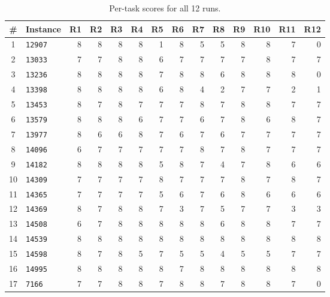\begin{table}[h]
\centering
\small
\caption{Per-task scores for all 12 runs.}\label{tab:scorecard}
\setlength{\tabcolsep}{3pt}
\begin{tabular}{clrrrrrrrrrrrr}
\toprule
\textbf{\#} & \textbf{Instance}
  & \textbf{R1} & \textbf{R2} & \textbf{R3} & \textbf{R4}
  & \textbf{R5} & \textbf{R6} & \textbf{R7} & \textbf{R8}
  & \textbf{R9} & \textbf{R10} & \textbf{R11} & \textbf{R12} \\
\midrule
 1 & \texttt{12907}  &  8 &  8 &  8 &  8 &  1 &  8 &  5 &  5 &  8 &  8 &  7 &  0 \\
 2 & \texttt{13033}  &  7 &  7 &  8 &  8 &  6 &  7 &  7 &  7 &  7 &  8 &  7 &  7 \\
 3 & \texttt{13236}  &  8 &  8 &  8 &  8 &  7 &  8 &  8 &  6 &  8 &  8 &  8 &  0 \\
 4 & \texttt{13398}  &  8 &  8 &  8 &  8 &  6 &  8 &  4 &  2 &  7 &  7 &  2 &  1 \\
 5 & \texttt{13453}  &  8 &  7 &  8 &  7 &  7 &  7 &  8 &  7 &  8 &  8 &  7 &  7 \\
 6 & \texttt{13579}  &  8 &  8 &  8 &  6 &  7 &  7 &  6 &  7 &  8 &  6 &  8 &  7 \\
 7 & \texttt{13977}  &  8 &  6 &  6 &  8 &  7 &  6 &  7 &  6 &  7 &  7 &  7 &  7 \\
 8 & \texttt{14096}  &  6 &  7 &  7 &  7 &  7 &  7 &  8 &  7 &  8 &  7 &  7 &  7 \\
 9 & \texttt{14182}  &  8 &  8 &  8 &  8 &  5 &  8 &  7 &  4 &  7 &  8 &  6 &  6 \\
10 & \texttt{14309}  &  7 &  7 &  7 &  7 &  8 &  7 &  7 &  7 &  8 &  7 &  8 &  7 \\
11 & \texttt{14365}  &  7 &  7 &  7 &  7 &  5 &  6 &  7 &  6 &  8 &  6 &  6 &  6 \\
12 & \texttt{14369}  &  8 &  7 &  8 &  8 &  7 &  3 &  7 &  5 &  7 &  7 &  3 &  3 \\
13 & \texttt{14508}  &  6 &  7 &  8 &  8 &  8 &  8 &  8 &  6 &  8 &  8 &  7 &  7 \\
14 & \texttt{14539}  &  8 &  8 &  8 &  8 &  8 &  8 &  8 &  8 &  8 &  8 &  8 &  8 \\
15 & \texttt{14598}  &  8 &  7 &  8 &  5 &  7 &  5 &  5 &  4 &  5 &  5 &  7 &  7 \\
16 & \texttt{14995}  &  8 &  8 &  8 &  8 &  8 &  7 &  8 &  8 &  8 &  8 &  8 &  8 \\
17 & \texttt{7166}   &  7 &  7 &  8 &  8 &  7 &  8 &  8 &  7 &  8 &  8 &  7 &  0 \\

\end{tabular}
\end{table}
